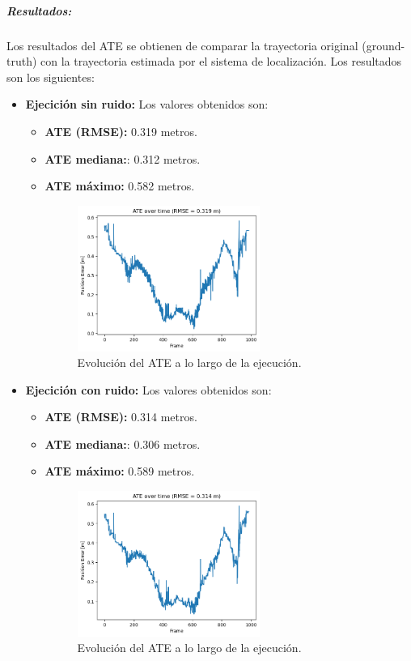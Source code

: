 \documentclass[12pt, a4paper, twoside]{article}
\begin{document}
\subparagraph{Resultados:}
Los resultados del ATE\cite{Chen2022DELOATE} se obtienen de comparar la trayectoria original (ground-truth) con la trayectoria estimada por el sistema de localización. 
Los resultados son los siguientes:
\begin{itemize}
  \item \textbf{Ejecición sin ruido:} Los valores obtenidos son:
  \begin{itemize}
    \item \textbf{ATE\cite{Chen2022DELOATE} (RMSE):} 0.319 metros.
    \item \textbf{ATE\cite{Chen2022DELOATE} mediana:}: 0.312 metros.
    \item \textbf{ATE\cite{Chen2022DELOATE} máximo:} 0.582 metros.
    \begin{figure}[h]
      \centering
        \includegraphics[width=0.6\textwidth]{ate_clean.png}
      \caption{Evolución del ATE\cite{Chen2022DELOATE} a lo largo de la ejecución.}
    \end{figure} 
  \end{itemize}
  \item \textbf{Ejecición con ruido:} Los valores obtenidos son:
  \begin{itemize}
    \item \textbf{ATE\cite{Chen2022DELOATE} (RMSE):} 0.314 metros.
    \item \textbf{ATE\cite{Chen2022DELOATE} mediana:}: 0.306 metros.
    \item \textbf{ATE\cite{Chen2022DELOATE} máximo:} 0.589 metros.
    \begin{figure}[h]
      \centering
        \includegraphics[width=0.6\textwidth]{ate_noisy.png}
      \caption{Evolución del ATE\cite{Chen2022DELOATE} a lo largo de la ejecución.}
    \end{figure} \newpage
  \end{itemize}
\end{itemize}
\end{document}
